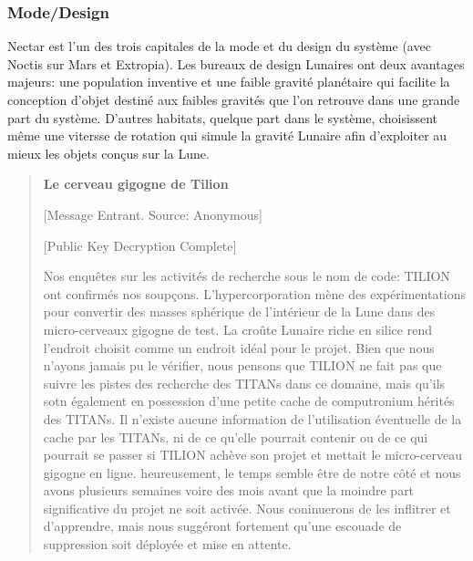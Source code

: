                                                          \subsubsection{Mode/Design} \label{sec:fashiondesign} 

                                                         Nectar est l'un des trois capitales de la mode et du design du système (avec Noctis sur Mars et Extropia). Les bureaux de design Lunaires ont deux avantages majeurs: une population inventive et une faible gravité planétaire qui facilite la conception d'objet destiné aux faibles gravités que l'on retrouve dans une grande part du système. D'autres habitats, quelque part dans le système, choisissent même une vitersse de rotation qui simule la gravité Lunaire afin d'exploiter au mieux les objets conçus sur la Lune. 

                                                         \begin{quotation} \textbf{Le cerveau gigogne de Tilion} 

                                                            [Message Entrant. Source: Anonymous] 

                                                            [Public Key Decryption Complete] 

                                                            Nos enquêtes sur les activités de recherche sous le nom de code: TILION ont confirmés nos soupçons. L'hypercorporation mène des expérimentations pour convertir des masses sphérique de l'intérieur de la Lune dans des micro-cerveaux gigogne de test. La croûte Lunaire riche en silice rend l'endroit choisit comme un endroit idéal pour le projet. Bien que nous n'ayons jamais pu le vérifier, nous pensons que TILION ne fait pas que suivre les pistes des recherche des TITANs dans ce domaine, mais qu'ils sotn également en possession d'une petite cache de computronium hérités des TITANs. Il n'existe aucune information de l'utilisation éventuelle de la cache par les TITANs, ni de ce qu'elle pourrait contenir ou de ce qui pourrait se passer si TILION achève son projet et mettait le micro-cerveau gigogne en ligne. heureusement, le temps semble être de notre côté et nous avons plusieurs semaines voire des mois avant que la moindre part significative du projet ne soit activée. Nous coninuerons de les inflitrer et d'apprendre, mais nous suggéront fortement qu'une escouade de suppression soit déployée et mise en attente. \end{quotation} 

